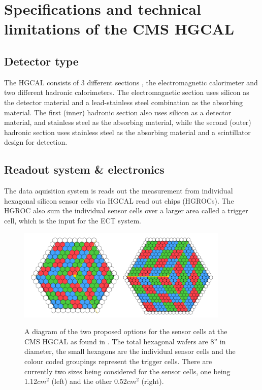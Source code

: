\documentclass[12 pt]{article}
\begin{document}
		
	\section{Specifications and technical limitations of the CMS HGCAL}
		\subsection{Detector type}	
			The HGCAL consists of 3 different sections \cite{TDR}, the electromagnetic calorimeter and two different hadronic calorimeters. The electromagnetic section uses silicon as the detector material and a lead-stainless steel combination as the absorbing material. The first (inner) hadronic section also uses silicon as a detector material, and stainless steel as the absorbing material, while the second (outer) hadronic section uses stainless steel as the absorbing material and a scintillator design for detection. 
		
		\subsection{Readout system \& electronics}
			The data aquisition system is reads out the measurement from individual hexagonal silicon sensor cells   \cite{TDR} via HGCAL read out chips (HGROCs). The HGROC also sum the individual sensor cells over a larger area called a trigger cell, which is the input for the ECT system. 

			\begin{figure}[H]
				\centering
				\includegraphics[width=0.9\textwidth]{readout-electronics.png}
				\label{readout}
				\caption{A diagram of the two proposed options for the sensor cells at the CMS HGCAL as found in \cite{TDR}. The total hexagonal wafers are 8'' in diameter, the small hexagons are the individual sensor cells and the colour coded groupings represent the trigger cells. There are currently two sizes being considered for the sensor cells, one being 1.12$cm^2$ (left) and the other 0.52$cm^2$ (right).}
			\end{figure}
\end{document}
